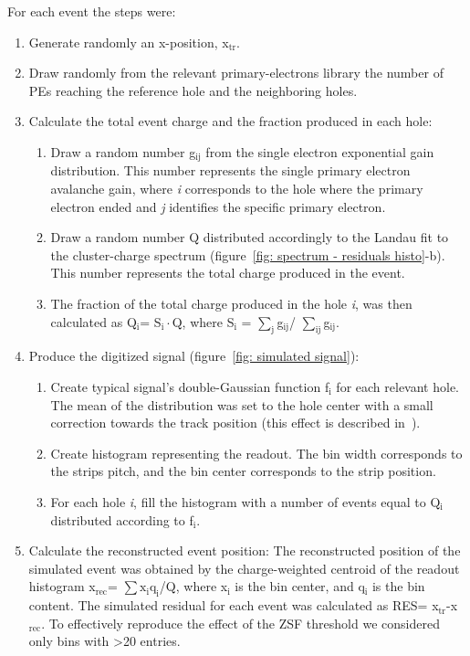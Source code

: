 For each event the steps were: 
\begin{enumerate}
\item Generate randomly an x-position, x$\mathrm{_{tr}}$.
\item Draw randomly from the relevant primary-electrons library the number of PEs reaching the reference hole and the neighboring holes.
\item Calculate the total event charge and the fraction produced in each hole: 
\begin{enumerate}
\item Draw a random number g$\mathrm{_{ij}}$ from the single electron exponential gain distribution. This number represents the single primary electron avalanche gain, where \textit{i} corresponds to the hole where the primary electron ended and \textit{j} identifies the specific primary electron.  
\item Draw a random number Q distributed accordingly to the Landau fit to the cluster-charge spectrum (figure~\ref{fig: spectrum - residuals histo}-b).  This number represents the total charge produced in the event.
\item The fraction of the total charge produced in the hole \textit{i}, was then calculated as Q$\mathrm{_i}$= S$\mathrm{_i}\cdot$Q, where S$\mathrm{_i}$ = $\mathrm{\sum_j}$g$\mathrm{_{ij}}$/ $\mathrm{\sum_{ij}}$g$\mathrm{_{ij}}$.
\end{enumerate}
\item Produce the digitized signal (figure~\ref{fig: simulated signal}):
\begin{enumerate}
\item Create typical signal's double-Gaussian function f$\mathrm{_i}$ for each relevant hole. The mean of the distribution was set to the hole center with a small correction towards the track position (this effect is described in~\cite{rubin2013optical}).
\item Create histogram representing the readout. The bin width corresponds to the strips pitch, and the bin center corresponds to the strip position.
\item For each hole \textit{i}, fill the histogram with a number of events equal to Q$\mathrm{_i}$ distributed according to f$\mathrm{_i}$.
\end{enumerate}
\item Calculate the reconstructed event position: 
The reconstructed position of the simulated event was obtained by the charge-weighted centroid of the readout histogram x$\mathrm{_{rec}}$= $\mathrm{\sum x_iq_i}$/Q, where x$\mathrm{_i}$ is the bin center, and q$\mathrm{_i}$ is the bin content. The simulated residual for each event was calculated as RES= x$\mathrm{_{tr}}$-x$\mathrm{_{rec}}$. To effectively reproduce the effect of the ZSF threshold we considered only bins with >20 entries.
\end{enumerate}
